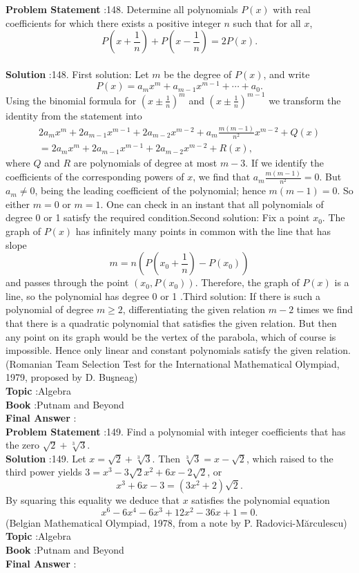 \documentclass[10pt]{article}
\begin{document}
\textbf{Problem Statement} :148. Determine all polynomials $P(x)$ with real coefficients for which there exists a positive integer $n$ such that for all $x$,$$ P\left(x+\frac{1}{n}\right)+P\left(x-\frac{1}{n}\right)=2 P(x) . $$\\
\textbf{Solution} :148. First solution: Let $m$ be the degree of $P(x)$, and write$$ P(x)=a_{m} x^{m}+a_{m-1} x^{m-1}+\cdots+a_{0} . $$Using the binomial formula for $\left(x \pm \frac{1}{n}\right)^{m}$ and $\left(x \pm \frac{1}{n}\right)^{m-1}$ we transform the identity from the statement into$$ \begin{array}{r} 2 a_{m} x^{m}+2 a_{m-1} x^{m-1}+2 a_{m-2} x^{m-2}+a_{m} \frac{m(m-1)}{n^{2}} x^{m-2}+Q(x) \\ =2 a_{m} x^{m}+2 a_{m-1} x^{m-1}+2 a_{m-2} x^{m-2}+R(x), \end{array} $$where $Q$ and $R$ are polynomials of degree at most $m-3$. If we identify the coefficients of the corresponding powers of $x$, we find that $a_{m} \frac{m(m-1)}{n^{2}}=0$. But $a_{m} \neq 0$, being the leading coefficient of the polynomial; hence $m(m-1)=0$. So either $m=0$ or $m=1$. One can check in an instant that all polynomials of degree 0 or 1 satisfy the required condition.Second solution: Fix a point $x_{0}$. The graph of $P(x)$ has infinitely many points in common with the line that has slope$$ m=n\left(P\left(x_{0}+\frac{1}{n}\right)-P\left(x_{0}\right)\right) $$and passes through the point $\left(x_{0}, P\left(x_{0}\right)\right)$. Therefore, the graph of $P(x)$ is a line, so the polynomial has degree 0 or 1 .Third solution: If there is such a polynomial of degree $m \geq 2$, differentiating the given relation $m-2$ times we find that there is a quadratic polynomial that satisfies the given relation. But then any point on its graph would be the vertex of the parabola, which of course is impossible. Hence only linear and constant polynomials satisfy the given relation.(Romanian Team Selection Test for the International Mathematical Olympiad, 1979, proposed by D. Buşneag)\\
\textbf{Topic} :Algebra\\
\textbf{Book} :Putnam and Beyond\\
\textbf{Final Answer} :\\


\textbf{Problem Statement} :149. Find a polynomial with integer coefficients that has the zero $\sqrt{2}+\sqrt[3]{3}$.\\
\textbf{Solution} :149. Let $x=\sqrt{2}+\sqrt[3]{3}$. Then $\sqrt[3]{3}=x-\sqrt{2}$, which raised to the third power yields $3=x^{3}-3 \sqrt{2} x^{2}+6 x-2 \sqrt{2}$, or$$ x^{3}+6 x-3=\left(3 x^{2}+2\right) \sqrt{2} . $$By squaring this equality we deduce that $x$ satisfies the polynomial equation$$ x^{6}-6 x^{4}-6 x^{3}+12 x^{2}-36 x+1=0 . $$(Belgian Mathematical Olympiad, 1978, from a note by P. Radovici-Mărculescu)\\
\textbf{Topic} :Algebra\\
\textbf{Book} :Putnam and Beyond\\
\textbf{Final Answer} :\\
\end{document}

